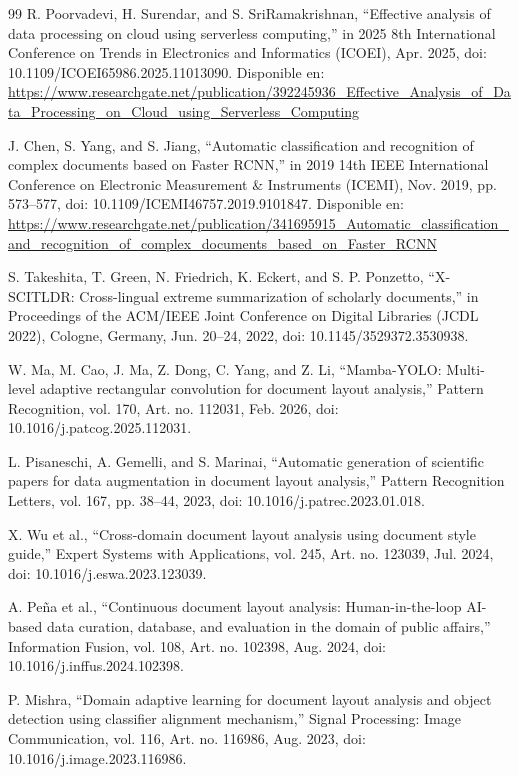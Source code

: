 \begin{thebibliography}{99}
   R. Poorvadevi, H. Surendar, and S. SriRamakrishnan, “Effective analysis of data processing on cloud using serverless computing,” in 2025 8th International Conference on Trends in Electronics and Informatics (ICOEI), Apr. 2025, doi: 10.1109/ICOEI65986.2025.11013090. Disponible en: \url{https://www.researchgate.net/publication/392245936_Effective_Analysis_of_Data_Processing_on_Cloud_using_Serverless_Computing}

   J. Chen, S. Yang, and S. Jiang, “Automatic classification and recognition of complex documents based on Faster RCNN,” in 2019 14th IEEE International Conference on Electronic Measurement \& Instruments (ICEMI), Nov. 2019, pp. 573--577, doi: 10.1109/ICEMI46757.2019.9101847. Disponible en: \url{https://www.researchgate.net/publication/341695915_Automatic_classification_and_recognition_of_complex_documents_based_on_Faster_RCNN}

   S. Takeshita, T. Green, N. Friedrich, K. Eckert, and S. P. Ponzetto, “X-SCITLDR: Cross-lingual extreme summarization of scholarly documents,” in Proceedings of the ACM/IEEE Joint Conference on Digital Libraries (JCDL 2022), Cologne, Germany, Jun. 20--24, 2022, doi: 10.1145/3529372.3530938.

   W. Ma, M. Cao, J. Ma, Z. Dong, C. Yang, and Z. Li, “Mamba-YOLO: Multi-level adaptive rectangular convolution for document layout analysis,” Pattern Recognition, vol. 170, Art. no. 112031, Feb. 2026, doi: 10.1016/j.patcog.2025.112031.

   L. Pisaneschi, A. Gemelli, and S. Marinai, “Automatic generation of scientific papers for data augmentation in document layout analysis,” Pattern Recognition Letters, vol. 167, pp. 38--44, 2023, doi: 10.1016/j.patrec.2023.01.018.

   X. Wu et al., “Cross-domain document layout analysis using document style guide,” Expert Systems with Applications, vol. 245, Art. no. 123039, Jul. 2024, doi: 10.1016/j.eswa.2023.123039.

   A. Peña et al., “Continuous document layout analysis: Human-in-the-loop AI-based data curation, database, and evaluation in the domain of public affairs,” Information Fusion, vol. 108, Art. no. 102398, Aug. 2024, doi: 10.1016/j.inffus.2024.102398.

   P. Mishra, “Domain adaptive learning for document layout analysis and object detection using classifier alignment mechanism,” Signal Processing: Image Communication, vol. 116, Art. no. 116986, Aug. 2023, doi: 10.1016/j.image.2023.116986.


\end{thebibliography}
